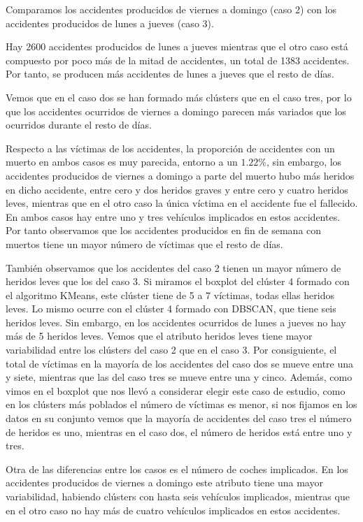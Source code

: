 \documentclass[a4]{article}
\begin{document}
Comparamos los accidentes producidos de viernes a domingo (caso 2) con los accidentes producidos de lunes a jueves (caso 3).

Hay 2600 accidentes producidos de lunes a jueves mientras que el otro caso está compuesto por poco más de la mitad de accidentes, un total de 1383 accidentes. Por tanto, se producen más accidentes de lunes a jueves que el resto de días.

Vemos que en el caso dos se han formado más clústers que en el caso tres, por lo que los accidentes ocurridos de viernes a domingo parecen más variados que los ocurridos durante el resto de días.

Respecto a las víctimas de los accidentes, la proporción de accidentes con un muerto en ambos casos es muy parecida, entorno a un $1.22\%$, sin embargo, los accidentes producidos de viernes a domingo a parte del muerto hubo más heridos en dicho accidente, entre cero y dos heridos graves y entre cero y cuatro heridos leves, mientras que en el otro caso la única víctima en el accidente fue el fallecido. En ambos casos hay entre uno y tres vehículos implicados en estos accidentes. Por tanto observamos que los accidentes producidos en fin de semana con muertos tiene un mayor número de víctimas que el resto de días.

También observamos que los accidentes del caso 2 tienen un mayor número de heridos leves que los del caso 3. Si miramos el boxplot del clúster 4 formado con el algoritmo KMeans, este clúster tiene de 5 a 7 víctimas, todas ellas heridos leves. Lo mismo ocurre con el clúster 4 formado con DBSCAN, que tiene seis heridos leves. Sin embargo, en los accidentes ocurridos de lunes a jueves no hay más de 5 heridos leves. Vemos que el atributo heridos leves tiene mayor variabilidad entre los clústers del caso 2 que en el caso 3. Por consiguiente, el total de víctimas en la mayoría de los accidentes del caso dos se mueve entre una y siete, mientras que las del caso tres se mueve entre una y cinco. Además, como vimos en el boxplot que nos llevó a considerar elegir este caso de estudio, como en los clústers más poblados el número de víctimas es menor, si nos fijamos en los datos en su conjunto vemos que la mayoría de accidentes del caso tres el número de heridos es uno, mientras en el caso dos, el número de heridos está entre uno y tres.

Otra de las diferencias entre los casos es el número de coches implicados. En los accidentes producidos de viernes a domingo este atributo tiene una mayor variabilidad, habiendo clústers con hasta seis vehículos implicados, mientras que en el otro caso no hay más de cuatro vehículos implicados en estos accidentes.
\end{document}
